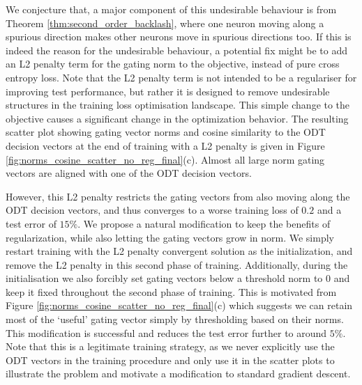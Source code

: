\documentclass{article}
\theoremstyle{plain}
\theoremstyle{definition}
\theoremstyle{remark}
\newcommand{\1}{{\mathbf 1}}
\newcommand{\0}{{\mathbf 0}}
\renewcommand{\>}{{\rightarrow}}
\begin{document}
We conjecture that, a major component of this undesirable behaviour is from Theorem \ref{thm:second_order_backlash}, where one neuron moving along a spurious direction makes other neurons move in spurious directions too. If this is indeed the reason for the undesirable behaviour, a potential fix might be to add an L2 penalty term for the gating norm to the objective, instead of pure cross entropy loss. Note that the L2 penalty term is not intended to be a regulariser for improving test performance, but rather it is designed to remove undesirable structures in the training loss optimisation landscape. This simple change to the objective causes a significant change in the optimization behavior. The resulting scatter plot showing gating vector norms and cosine similarity to the ODT decision vectors at the end of training with a L2 penalty is given in Figure \ref{fig:norms_cosine_scatter_no_reg_final}(c). Almost all large norm gating vectors are aligned with one of the ODT decision vectors. 


However, this L2 penalty restricts the gating vectors from also moving along the ODT decision vectors, and thus converges to a worse training loss of $0.2$ and a test error of $15\%$. We propose a natural modification to keep the benefits of regularization, while also letting the gating vectors grow in norm. We simply restart training with the L2 penalty convergent solution as the initialization, and remove the L2 penalty in this second phase of training. Additionally, during the initialisation we also forcibly set gating vectors below a threshold norm to $0$ and keep it fixed throughout the second phase of training. This is motivated from Figure \ref{fig:norms_cosine_scatter_no_reg_final}(c) which suggests we can retain most of the `useful' gating vector simply by thresholding based on their norms. 
This modification is successful and reduces the test error further to around $5\%$. Note that this is a legitimate training strategy, as we never explicitly use the ODT vectors in the training procedure and only use it in the scatter plots to illustrate the problem and motivate a modification to standard gradient descent.
\end{document}
